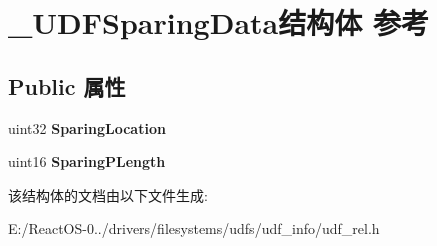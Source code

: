 \hypertarget{struct___u_d_f_sparing_data}{}\section{\+\_\+\+U\+D\+F\+Sparing\+Data结构体 参考}
\label{struct___u_d_f_sparing_data}
\subsection*{Public 属性}
\begin{DoxyCompactItemize}
\item 
\mbox{\label{struct___u_d_f_sparing_data_aff808f7345b249426f706af872ac2f52}} 
uint32 {\bfseries Sparing\+Location}
\item 
\mbox{\label{struct___u_d_f_sparing_data_a85bf45008dc5ea25df7888892dca3654}} 
uint16 {\bfseries Sparing\+P\+Length}
\end{DoxyCompactItemize}


该结构体的文档由以下文件生成\+:\begin{DoxyCompactItemize}
\item 
E\+:/\+React\+O\+S-\/0../drivers/filesystems/udfs/udf\+\_\+info/udf\+\_\+rel.\+h\end{DoxyCompactItemize}

